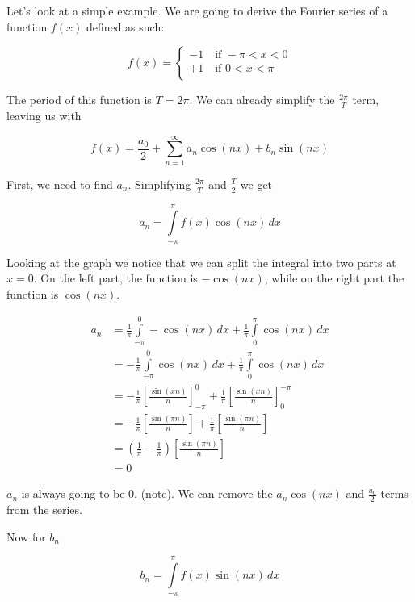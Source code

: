 \documentclass{article}
\newcommand{\integral}[4]{\int\limits_{#1}^{#2} #3\,d#4}
\begin{document}
\begin{preview}
\pagecolor[HTML]{161923}
\color[HTML]{c8c9db}
\Huge


Let's look at a simple example. We are going to derive the Fourier series of a function \(f(x)\) defined as such:

\[
    f(x)=
    \begin{cases}
        -1\quad \text{if } -\pi < x < 0 \\
        +1\quad \text{if } 0 < x < \pi \\
    \end{cases}
\]

The period of this function is \(T=2\pi\). We can already simplify the \(\frac{2\pi}{T}\) term, leaving us with

\[
    f(x)=\frac{a_0}{2} + \sum_{n=1}^{\infty} a_n \cos(nx) + b_n \sin(nx)
\]

First, we need to find \(a_n\). Simplifying \(\frac{2\pi}{T}\) and \(\frac{T}{2}\) we get

\[
    a_n=\integral{-\pi}{\pi}{f(x)\cos(nx)}{x}
\]

Looking at the graph we notice that we can split the integral into two parts at \(x=0\).
On the left part, the function is \(-\cos(nx)\), while on the right part the function is \(\cos(nx)\).

\begin{align*}
    a_n &=
    \frac{1}{\pi} \integral{-\pi}{0}{-\cos(nx)}{x} +
    \frac{1}{\pi} \integral{0}{\pi}{\cos(nx)}{x} \\
    &= -\frac{1}{\pi} \integral{-\pi}{0}{\cos(nx)}{x} +
    \frac{1}{\pi} \integral{0}{\pi}{\cos(nx)}{x} \\
    &= -\frac{1}{\pi} {\left[\frac{\sin(xn)}{n}\right]}_{-\pi}^{0} +
    \frac{1}{\pi} {\left[\frac{\sin(xn)}{n}\right]}_{0}^{-\pi} \\
    &= -\frac{1}{\pi} \left[\frac{\sin(\pi n)}{n}\right] +
    \frac{1}{\pi} \left[\frac{\sin(\pi n)}{n}\right] \\
    &= \left(\frac{1}{\pi}-\frac{1}{\pi}\right) \left[\frac{\sin(\pi n)}{n}\right] \\
    &= 0
\end{align*}

\(a_n\) is always going to be 0. (note). We can remove the \(a_n \cos(nx)\) and \(\frac{a_0}{2}\) terms from the series.

Now for \(b_n\)

\[
    b_n=\integral{-\pi}{\pi}{f(x)\sin(nx)}{x}
\]


\end{preview}
\end{document}
